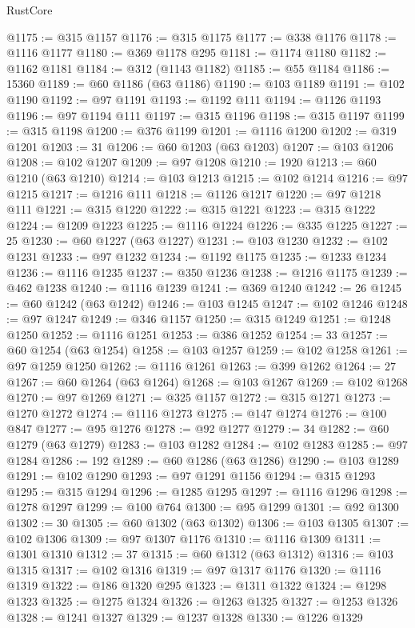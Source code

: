 \begin{lexlean}{RustCore}
\begin{coremodule}
@1175 := @315 @1157
@1176 := @315 @1175
@1177 := @338 @1176
@1178 := @1116 @1177
@1180 := @369 @1178 @295
@1181 := @1174 @1180
@1182 := @1162 @1181
@1184 := @312 (@1143 @1182)
@1185 := @55 @1184
@1186 := 15360
@1189 := @60 @1186 (@63 @1186)
@1190 := @103 @1189
@1191 := @102 @1190
@1192 := @97 @1191
@1193 := @1192 @111
@1194 := @1126 @1193
@1196 := @97 @1194 @111
@1197 := @315 @1196
@1198 := @315 @1197
@1199 := @315 @1198
@1200 := @376 @1199
@1201 := @1116 @1200
@1202 := @319 @1201
@1203 := 31
@1206 := @60 @1203 (@63 @1203)
@1207 := @103 @1206
@1208 := @102 @1207
@1209 := @97 @1208
@1210 := 1920
@1213 := @60 @1210 (@63 @1210)
@1214 := @103 @1213
@1215 := @102 @1214
@1216 := @97 @1215
@1217 := @1216 @111
@1218 := @1126 @1217
@1220 := @97 @1218 @111
@1221 := @315 @1220
@1222 := @315 @1221
@1223 := @315 @1222
@1224 := @1209 @1223
@1225 := @1116 @1224
@1226 := @335 @1225
@1227 := 25
@1230 := @60 @1227 (@63 @1227)
@1231 := @103 @1230
@1232 := @102 @1231
@1233 := @97 @1232
@1234 := @1192 @1175
@1235 := @1233 @1234
@1236 := @1116 @1235
@1237 := @350 @1236
@1238 := @1216 @1175
@1239 := @462 @1238
@1240 := @1116 @1239
@1241 := @369 @1240
@1242 := 26
@1245 := @60 @1242 (@63 @1242)
@1246 := @103 @1245
@1247 := @102 @1246
@1248 := @97 @1247
@1249 := @346 @1157
@1250 := @315 @1249
@1251 := @1248 @1250
@1252 := @1116 @1251
@1253 := @386 @1252
@1254 := 33
@1257 := @60 @1254 (@63 @1254)
@1258 := @103 @1257
@1259 := @102 @1258
@1261 := @97 @1259 @1250
@1262 := @1116 @1261
@1263 := @399 @1262
@1264 := 27
@1267 := @60 @1264 (@63 @1264)
@1268 := @103 @1267
@1269 := @102 @1268
@1270 := @97 @1269
@1271 := @325 @1157
@1272 := @315 @1271
@1273 := @1270 @1272
@1274 := @1116 @1273
@1275 := @147 @1274
@1276 := @100 @847
@1277 := @95 @1276
@1278 := @92 @1277
@1279 := 34
@1282 := @60 @1279 (@63 @1279)
@1283 := @103 @1282
@1284 := @102 @1283
@1285 := @97 @1284
@1286 := 192
@1289 := @60 @1286 (@63 @1286)
@1290 := @103 @1289
@1291 := @102 @1290
@1293 := @97 @1291 @1156
@1294 := @315 @1293
@1295 := @315 @1294
@1296 := @1285 @1295
@1297 := @1116 @1296
@1298 := @1278 @1297
@1299 := @100 @764
@1300 := @95 @1299
@1301 := @92 @1300
@1302 := 30
@1305 := @60 @1302 (@63 @1302)
@1306 := @103 @1305
@1307 := @102 @1306
@1309 := @97 @1307 @1176
@1310 := @1116 @1309
@1311 := @1301 @1310
@1312 := 37
@1315 := @60 @1312 (@63 @1312)
@1316 := @103 @1315
@1317 := @102 @1316
@1319 := @97 @1317 @1176
@1320 := @1116 @1319
@1322 := @186 @1320 @295
@1323 := @1311 @1322
@1324 := @1298 @1323
@1325 := @1275 @1324
@1326 := @1263 @1325
@1327 := @1253 @1326
@1328 := @1241 @1327
@1329 := @1237 @1328
@1330 := @1226 @1329

\end{coremodule}
\end{lexlean}
